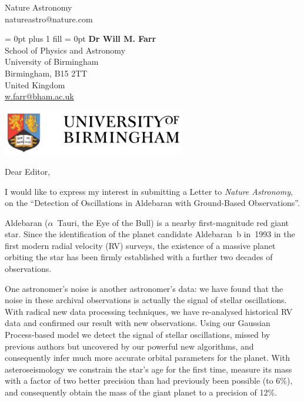 \documentclass[11pt]{letter} %
\begin{document}
%
\longindentation=0pt                       %
\let\raggedleft\raggedright                %

\nopagebreak  
\begin{letter}
{Nature Astronomy \\
natureastro@nature.com \\}
      
{
\leftskip = 0pt plus 1 fill
\rightskip = 0pt
\parindent 0pt
%
%
{{\bf Dr Will M. Farr}} \\
School of Physics and Astronomy\\
University of Birmingham\\
Birmingham, B15 2TT\\
United Kingdom\\
 \url{w.farr@bham.ac.uk} \\
 
}


\begin{minipage}[c]{5in}\vskip-4.25cm
\begin{flushleft}
	\begin{minipage}[c]{3cm}
		\begin{flushleft}
			\includegraphics*[width=8cm]{birmingham_logo.png}%
		\end{flushleft}
	\end{minipage}
\end{flushleft}
\end{minipage}

\opening{Dear Editor,} 
 
\noindent I would like to express my interest in submitting a Letter to \emph{Nature Astronomy}, on the ``Detection of Oscillations in Aldebaran with Ground-Based Observations''.

Aldebaran ($\alpha$~Tauri, the Eye of the Bull) is a nearby first-magnitude red giant star. Since the identification of the planet candidate Aldebaran~b in~1993 in the first modern radial velocity (RV) surveys, the existence of a massive planet orbiting the star has been firmly established with a further two decades of observations. 

One astronomer's noise is another astronomer's data: we have found that the noise in these archival observations is actually the signal of stellar oscillations. With radical new data processing techniques, we have re-analysed historical RV data and confirmed our result with new observations. Using our Gaussian Process-based model we detect the signal of stellar oscillations, missed by previous authors but uncovered by our powerful new algorithms, and consequently infer much more accurate orbital parameters for the planet. With asteroseismology we constrain the star's age for the first time, measure its mass with a factor of two better precision than had previously been possible (to 6\%), and consequently obtain the mass of the giant planet to a precision of 12\%.


\end{letter}
\end{document}

